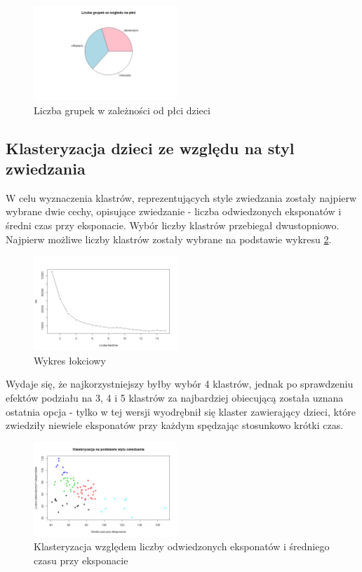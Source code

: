 \documentclass[conference]{IEEEtran}
\begin{document}
\begin{figure}[H]
\includegraphics[width=0.48\textwidth]{grupki_plec.png}
\caption{Liczba grupek w zależności od płci dzieci}
\label{grupki_plec}
\end{figure}

\subsection{Klasteryzacja dzieci ze względu na styl zwiedzania}
W celu wyznaczenia klastrów, reprezentujących style zwiedzania zostały najpierw wybrane dwie cechy, opisujące zwiedzanie - liczba odwiedzonych eksponatów i średni czas przy eksponacie. Wybór liczby klastrów przebiegał dwustopniowo. Najpierw możliwe liczby klastrów zostały wybrane na podstawie wykresu \ref{style_zwiedzania_elbow}.

\begin{figure}[H]
\includegraphics[width=0.48\textwidth]{style_zwiedzania_elbow.png}
\caption{Wykres łokciowy}
\label{style_zwiedzania_elbow}
\end{figure}

Wydaje się, że najkorzystniejszy byłby wybór 4 klastrów, jednak po sprawdzeniu efektów podziału na 3, 4 i 5 klastrów za najbardziej obiecującą została uznana ostatnia opcja - tylko w tej wersji wyodrębnił się klaster zawierający dzieci, które zwiedziły niewiele eksponatów przy każdym spędzając stosunkowo krótki czas.

\begin{figure}[H]
\includegraphics[width=0.48\textwidth]{style_zwiedzania.png}
\caption{Klasteryzacja względem liczby odwiedzonych eksponatów i średniego czasu przy eksponacie}
\label{style_zwiedzania}
\end{figure}
\end{document}
